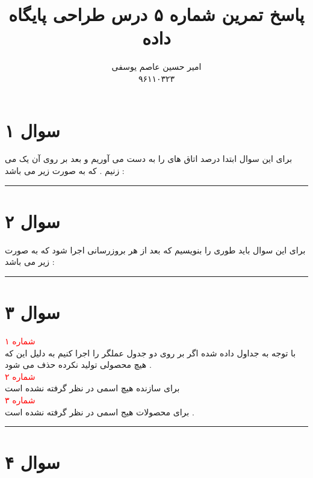 \documentclass{article}
\title{پاسخ تمرین شماره ۵ درس طراحی پایگاه داده }
\author{امیر حسین عاصم یوسفی \\ ۹۶۱۱۰۳۲۳}
\begin{document}
	\maketitle
	\section*{سوال ۱}
	برای این سوال ابتدا درصد اتاق های 
را به دست می آوریم و بعد بر روی آن یک 
می زنیم  . که به صورت زیر می باشد : 

\begin{center}
\end{center}
\hrule
\section*{سوال ۲ }
برای این سوال باید طوری 
را بنویسیم که بعد از هر بروزرسانی اجرا شود که به صورت زیر می باشد : 
\begin{flushleft}
\end{flushleft}
\hrule
\section*{سوال ۳}
\textcolor{red}{شماره ۱ }
\\
با توجه به جداول داده شده اگر بر روی دو جدول عملگر 
را اجرا کنیم 
به دلیل این که هیچ محصولی تولید نکرده حذف می شود  . 
\\
\textcolor{red}{شماره ۲  }
\\
برای سازنده 
هیچ اسمی در نظر گرفته نشده است 
\\
\textcolor{red}{شماره ۳}
\\
برای محصولات 
هیج اسمی در نظر گرفته نشده است  . 
\hrule

\section*{سوال ۴ }
\end{document}
